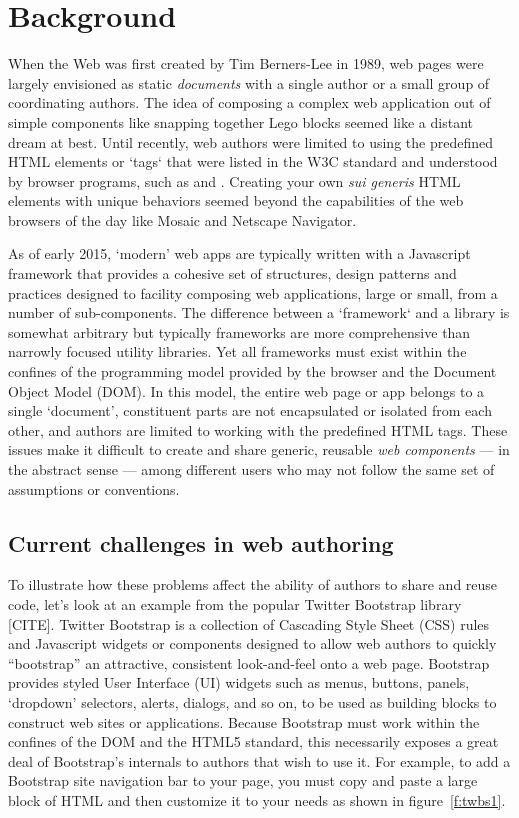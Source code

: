 \chapter{Background}
%

When the Web was first created by Tim Berners-Lee in 1989, web pages were largely envisioned as static \textit{documents} with a single author or a small group of coordinating authors. 
The idea of composing a complex web application out of simple components like snapping together Lego blocks seemed like a distant dream at best.
Until recently, web authors were limited to using the predefined HTML elements or `tags` that were listed in the W3C standard and understood by browser programs, such as  and . 
Creating your own \textit{sui generis} HTML elements with unique behaviors seemed beyond the capabilities of the web browsers of the day like Mosaic and Netscape Navigator.

As of early 2015, `modern' web apps are typically written with a Javascript framework that provides a cohesive set of structures, design patterns and practices designed to facility composing web applications, large or small, from a number of sub-components.
The difference between a `framework` and a library is somewhat arbitrary but typically frameworks are more comprehensive than narrowly focused utility libraries.
Yet all frameworks must exist within the confines of the programming model provided by the browser and the Document Object Model (DOM). 
In this model, the entire web page or app belongs to a single `document', constituent parts are not encapsulated or isolated from each other, and authors are limited to working with the predefined HTML tags.
These issues make it difficult to create and share generic, reusable \textit{web components} 
--- in the abstract sense --- 
among different users who may not follow the same set of assumptions or conventions.

\section{Current challenges in web authoring}
To illustrate how these problems affect the ability of authors to share and reuse code, let's look at an example from the popular Twitter Bootstrap library [CITE].
Twitter Bootstrap is a collection of Cascading Style Sheet (CSS) rules and Javascript widgets or components designed to allow web authors to quickly ``bootstrap'' an attractive, consistent look-and-feel onto a web page.
Bootstrap provides styled User Interface (UI) widgets such as menus, buttons, panels, `dropdown' selectors, alerts, dialogs, and so on, to be used as building blocks to construct web sites or applications.
Because Bootstrap must work within the confines of the DOM and the HTML5 standard, this necessarily exposes a great deal of Bootstrap's internals to authors that wish to use it. 
For example, to add a Bootstrap site navigation bar to your page, you must copy and paste a large block of HTML and then customize it to your needs as shown in figure~\ref{f:twbs1}.

